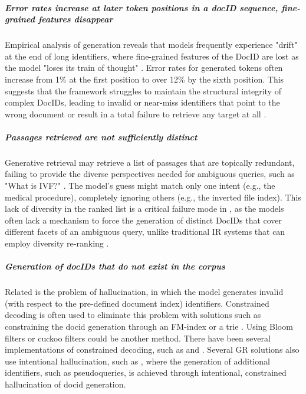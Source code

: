 \subparagraph{Error rates increase at later token positions in a docID sequence, fine-grained features disappear}
Empirical analysis of  generation reveals that models frequently experience "drift" at the end of long identifiers, where fine-grained features of the DocID are lost as the model "loses its train of thought" \cite{peiwen-yuan-generative-dense}. Error rates for generated tokens often increase from 1\% at the first position to over 12\% by the sixth position. This suggests that the  framework struggles to maintain the structural integrity of complex DocIDs, leading to invalid or near-miss identifiers that point to the wrong document or result in a total failure to retrieve any target at all \cite{ye-wang-mindref-mimicking}.

\subparagraph{Passages retrieved are not sufficiently distinct}
Generative retrieval may retrieve a list of passages that are topically redundant, failing to provide the diverse perspectives needed for ambiguous queries, such as "What is IVF?" \cite{cheng-descriptive-and, weiwei-sun-learning-to}. The model’s guess might match only one intent (e.g., the medical procedure), completely ignoring others (e.g., the inverted file index). This lack of diversity in the ranked list is a critical failure mode in , as the models often lack a mechanism to force the generation of distinct DocIDs that cover different facets of an ambiguous query, unlike traditional IR systems that can employ diversity re-ranking \cite{xiaoxi-li-from-matching}.

\subparagraph{Generation of docIDs that do not exist in the corpus}
Related is the problem of hallucination, in which the model generates invalid (with respect to the pre-defined document index) identifiers. Constrained decoding is often used to eliminate this problem with solutions such as constraining the docid generation through an FM-index \cite{michele-bevilacqua-autoregressive-search} or a trie \cite{nicola-de-cao-autoregressive-entity}. Using Bloom filters \cite{bloom-spacetime-tradeoffs} or cuckoo filters \cite{fan-cuckoo} could be another method. There have been several implementations of constrained decoding, such as  \cite{michele-bevilacqua-autoregressive-search} and  \cite{yongqi-li-multiview-identifiers}. Several GR solutions also use intentional hallucination, such as \cite{yongqi-li-multiview-identifiers}, where the generation of additional identifiers, such as pseudoqueries, is achieved through intentional, constrained hallucination of docid generation.


